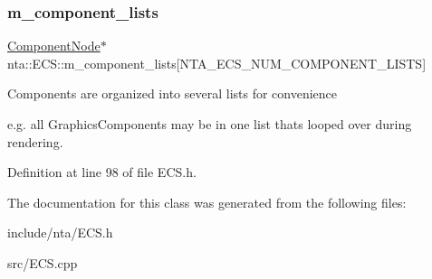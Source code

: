 \subsubsection{\texorpdfstring{m\+\_\+component\+\_\+lists}{m\_component\_lists}}
{\footnotesize\ttfamily \hyperlink{structnta_1_1ComponentNode}{Component\+Node}$\ast$ nta\+::\+E\+C\+S\+::m\+\_\+component\+\_\+lists\mbox{[}N\+T\+A\+\_\+\+E\+C\+S\+\_\+\+N\+U\+M\+\_\+\+C\+O\+M\+P\+O\+N\+E\+N\+T\+\_\+\+L\+I\+S\+TS\mbox{]}\hspace{0.3cm}{\ttfamily [private]}}

Components are organized into several lists for convenience

e.\+g. all Graphics\+Components may be in one list that\textquotesingle{}s looped over during rendering. 

Definition at line 98 of file E\+C\+S.\+h.



The documentation for this class was generated from the following files\+:\begin{DoxyCompactItemize}
\item 
include/nta/E\+C\+S.\+h\item 
src/E\+C\+S.\+cpp\end{DoxyCompactItemize}
